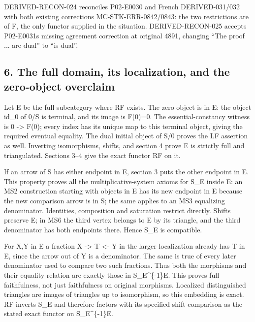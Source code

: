 DERIVED-RECON-024 reconciles P02-E0030 and French DERIVED-031/\allowbreak{}032 with both existing corrections MC-STK-ERR-0842/\allowbreak{}0843:\allowbreak{} the two restrictions are of F,\allowbreak{} the only functor supplied in the situation. DERIVED-RECON-025 accepts P02-E0031\textquotesingle s missing agreement correction at original 4891,\allowbreak{} changing ``The proof ... are dual'' to ``is dual''.

\subsection{\texorpdfstring{6. The full domain,\allowbreak{} its localization,\allowbreak{} and the zero-object overclaim}{6. The full  its  and the zero-object overclaim}}\label{proofs-4166-5089-the-full-domain-its-localization-and-the-zero-object-overclaim}

Let E be the full subcategory where RF exists. The zero object is in E:\allowbreak{} the object id\_\allowbreak{}0 of 0/\allowbreak{}S is terminal,\allowbreak{} and its image is F(0)\allowbreak{}\allowbreak{}=0. The essential-constancy witness is 0 \allowbreak{}-> F(0)\allowbreak{}; every index has its unique map to this terminal object,\allowbreak{} giving the required eventual equality. The dual initial object of S/\allowbreak{}0 proves the LF assertion as well. Inverting isomorphisms,\allowbreak{} shifts,\allowbreak{} and section 4 prove E is strictly full and triangulated. Sections 3–\allowbreak{}4 give the exact functor RF on it.

If an arrow of S has either endpoint in E,\allowbreak{} section 3 puts the other endpoint in E. This property proves all the multiplicative-system axioms for S\_\allowbreak{}E inside E:\allowbreak{} an MS2 construction starting with objects in E has its new endpoint in E because the new comparison arrow is in S; the same applies to an MS3 equalizing denominator. Identities,\allowbreak{} composition and saturation restrict directly. Shifts preserve E; in MS6 the third vertex belongs to E by its triangle,\allowbreak{} and the third denominator has both endpoints there. Hence S\_\allowbreak{}E is compatible.

For X,\allowbreak{}Y in E a fraction X \allowbreak{}-> T \textless- Y in the larger localization already has T in E,\allowbreak{} since the arrow out of Y is a denominator. The same is true of every later denominator used to compare two such fractions. Thus both the morphisms and their equality relation are exactly those in S\_\allowbreak{}E\textasciicircum{}\{-1\}E. This proves full faithfulness,\allowbreak{} not just faithfulness on original morphisms. Localized distinguished triangles are images of triangles up to isomorphism,\allowbreak{} so this embedding is exact. RF inverts S\_\allowbreak{}E and therefore factors with its specified shift comparison as the stated exact functor on S\_\allowbreak{}E\textasciicircum{}\{-1\}E.

